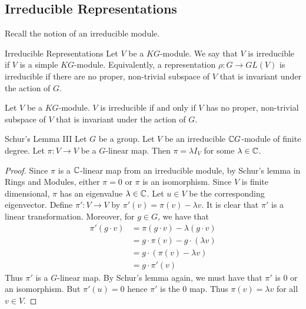 \documentclass[a4paper]{article}
\begin{document}
\subsection{Irreducible Representations}
Recall the notion of an irreducible module. 

\begin{defn}{Irreducible Representations}{} Let $V$ be a $KG$-module. We say that $V$ is irreducible if $V$ is a simple $KG$-module. Equivalently, a representation $\rho:G\to GL(V)$ is irreducible if there are no proper, non-trivial subspace of $V$ that is invariant under the action of $G$. 
\end{defn}

\begin{prp}{}{} Let $V$ be a $KG$-module. $V$ is irreducible if and only if $V$ has no proper, non-trivial subspace of $V$ that is invariant under the action of $G$. 
\end{prp}

\begin{thm}{Schur's Lemma III}{} Let $G$ be a group. Let $V$ be an irreducible $\mathbb{C} G$-module of finite degree. Let $\pi:V\to V$ be a $G$-linear map. Then $\pi=\lambda I_V$ for some $\lambda\in\mathbb{C}$. \tcbline
\begin{proof}
Since $\pi$ is a $\mathbb{C}$-linear map from an irreducible module, by Schur's lemma in Rings and Modules, either $\pi=0$ or $\pi$ is an isomorphism. Since $V$ is finite dimensional, $\pi$ has an eigenvalue $\lambda\in\mathbb{C}$. Let $u\in V$ be the corresponding eigenvector. Define $\pi':V\to V$ by $\pi'(v)=\pi(v)-\lambda v$. It is clear that $\pi'$ is a linear transformation. Moreover, for $g\in G$, we have that 
\begin{align*}
\pi'(g\cdot v)&=\pi(g\cdot v)-\lambda(g\cdot v)\\
&=g\cdot\pi(v)-g\cdot(\lambda v)\\
&=g\cdot(\pi(v)-\lambda v)\\
&=g\cdot\pi'(v)
\end{align*}
Thus $\pi'$ is a $G$-linear map. By Schur's lemma again, we must have that $\pi'$ is $0$ or an isomorphism. But $\pi'(u)=0$ hence $\pi'$ is the $0$ map. Thus $\pi(v)=\lambda v$ for all $v\in V$. 
\end{proof}
\end{thm}
\end{document}
